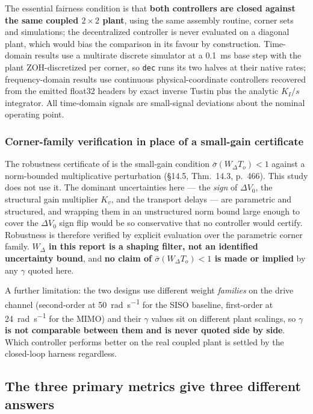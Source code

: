 \documentclass[energies,article,submit,pdftex,oneauthor]{Definitions/mdpi}
\begin{document}
The essential fairness condition is that \textbf{both controllers are closed against the same
coupled $2\times2$ plant}, using the same assembly routine, corner sets and simulations; the
decentralized controller is never evaluated on a diagonal plant, which would bias the
comparison in its favour by construction. Time-domain results use a multirate discrete simulator at a
\SI{0.1}{\milli\second} base step with the plant ZOH-discretized per corner, so \texttt{dec} runs
its two halves at their native rates; frequency-domain results use continuous
physical-coordinate controllers recovered from the emitted float32 headers by exact inverse
Tustin plus the analytic $K_I/s$ integrator. All time-domain signals are small-signal deviations
about the nominal operating point.

\subsubsection{Corner-family verification in place of a small-gain certificate}
The robustness certificate of \citep{assadian2020neoclassical} is the small-gain condition
$\bar\sigma(W_{\Delta}T_o) < 1$ against a norm-bounded multiplicative perturbation (\S14.5,
Thm.~14.3, p.~466). This study does not use it. The dominant uncertainties here --- the
\emph{sign} of $\Delta V_0$, the structural gain multiplier $K_v$, and the transport delays ---
are parametric and structured, and wrapping them in an unstructured norm bound large enough to
cover the $\Delta V_0$ sign flip would be so conservative that no controller would certify.
Robustness is therefore verified by explicit evaluation over the parametric corner family.
\textbf{$W_{\Delta}$ in this report is a shaping filter,
not an identified uncertainty bound}, and \textbf{no claim of $\bar\sigma(W_{\Delta}T_o) < 1$ is
made or implied} by any $\gamma$ quoted here.

A further limitation: the two designs use different weight
\emph{families} on the drive channel (second-order at \SI{50}{\radian\per\second} for the SISO
baseline, first-order at \SI{24}{\radian\per\second} for the MIMO) and their $\gamma$ values sit
on different plant scalings, so \textbf{$\gamma$ is not comparable between them and is never
quoted side by side}. Which controller performs better on the real coupled plant is settled by
the closed-loop harness regardless.

\subsection{The three primary metrics give three different answers}
\end{document}

